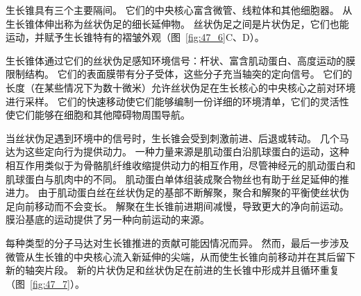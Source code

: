 生长锥具有三个主要隔间。
它们的中央核心富含微管、线粒体和其他细胞器。
从生长锥体伸出称为丝状伪足的细长延伸物。
丝状伪足之间是片状伪足，它们也能运动，并赋予生长锥特有的褶皱外观（图~\ref{fig:47_6}C、D）。


生长锥体通过它们的丝状伪足感知环境信号：杆状、富含肌动蛋白、高度运动的膜限制结构。
它们的表面膜带有分子受体，这些分子充当轴突的定向信号。
它们的长度（在某些情况下为数十微米）允许丝状伪足在生长核心的中央核心之前对环境进行采样。
它们的快速移动使它们能够编制一份详细的环境清单，它们的灵活性使它们能够在细胞和其他障碍物周围导航。


当丝状伪足遇到环境中的信号时，生长锥会受到刺激前进、后退或转动。
几个马达为这些定向行为提供动力。
一种力量来源是肌动蛋白沿肌球蛋白的运动，这种相互作用类似于为骨骼肌纤维收缩提供动力的相互作用，尽管神经元的肌动蛋白和肌球蛋白与肌肉中的不同。
肌动蛋白单体组装成聚合物丝也有助于丝足延伸的推进力。
由于肌动蛋白丝在丝状伪足的基部不断解聚，聚合和解聚的平衡使丝状伪足向前移动而不会变长。
解聚在生长锥前进期间减慢，导致更大的净向前运动。
膜沿基底的运动提供了另一种向前运动的来源。


每种类型的分子马达对生长锥推进的贡献可能因情况而异。
然而，最后一步涉及微管从生长锥的中央核心流入新延伸的尖端，从而使生长锥向前移动并在其后留下新的轴突片段。
新的片状伪足和丝状伪足在前进的生长锥中形成并且循环重复（图~\ref{fig:47_7}）。


